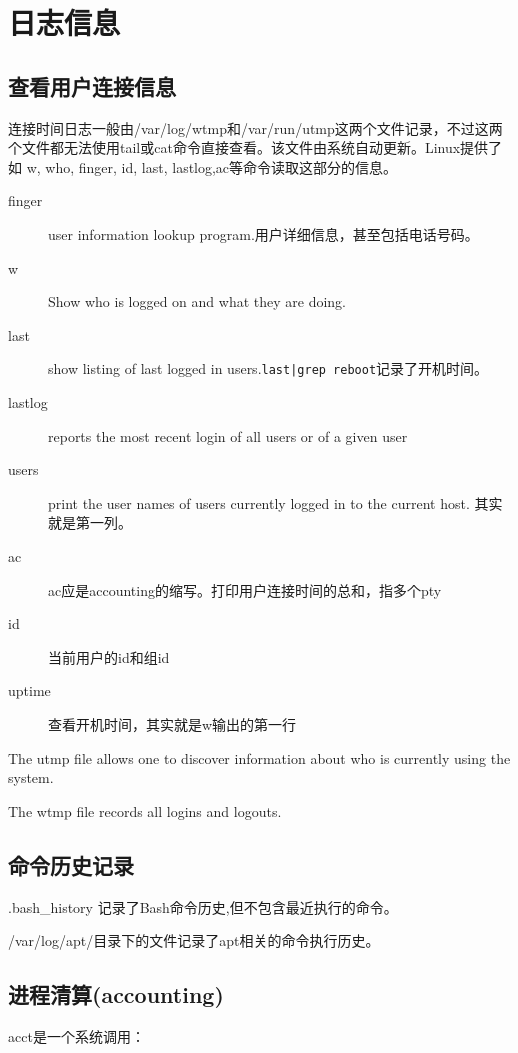 \section{日志信息}


\subsection{查看用户连接信息}
连接时间日志一般由/var/log/wtmp和/var/run/utmp这两个文件记录，不过这两个文件都无法使用tail或cat命令直接查看。该文件由系统自动更新。Linux提供了如 w, who, finger, id, last, lastlog,ac等命令读取这部分的信息。
\begin{description}
    \item[finger]user information lookup program.用户详细信息，甚至包括电话号码。 
    \item[w]Show who is logged on and what they are doing.
    \item[last]show listing of last logged in users.\verb+last|grep reboot+记录了开机时间。 
    \item[lastlog] reports the most recent login of all users or of a given user
    \item[users]print the user names of users currently logged in to the current host. 其实就是第一列。
    \item[ac]ac应是accounting的缩写。打印用户连接时间的总和，指多个pty
    \item[id]当前用户的id和组id
    \item[uptime]查看开机时间，其实就是w输出的第一行
\end{description}

The utmp file allows one to discover information about who is currently using the system. 

The  wtmp  file records all logins and logouts.

\subsection{命令历史记录}


.bash\_history 记录了Bash命令历史,但不包含最近执行的命令。

/var/log/apt/目录下的文件记录了apt相关的命令执行历史。

\subsection{进程清算(accounting)}

acct是一个系统调用：

